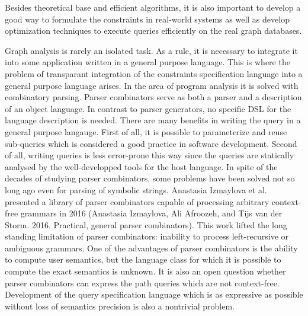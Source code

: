 \documentclass[12pt]{article}  %
\theoremstyle{remark}
\begin{document}
Besides theoretical base and efficient algorithms, it is also important to develop a good way to formulate the constraints in real-world systems as well as develop optimization techniques to execute queries efficiently on the real graph databases.

Graph analysis is rarely an isolated task.
As a rule, it is necessary to integrate it into some application written in a general purpose language.
This is where the problem of transparant integration of the constraints specification language into a general purpose language arises.
In the area of program analysis it is solved with combinatory parsing.
Parser combinators serve as both a parser and a description of an object language.
In contrast to parser generators, no specific DSL for the language description is needed.
There are many benefits in writing the query in a general purpose langauge.
First of all, it is possible to parameterize and reuse sub-queries which is considered a good practice in software development.
Second of all, writing queries is less error-prone this way since the queries are statically analysed by the well-developped tools for the host language.
In spite of the decades of studying parser combinators, some problems have been solved not so long ago even for parsing of symbolic strings.
Anastasia Izmaylova et al. presented a library of parser combinators capable of processing arbitrary context-free grammars in 2016 (Anastasia Izmaylova, Ali Afroozeh, and Tijs van der Storm. 2016. Practical, general parser combinators).
This work lifted the long standing limitation of parser combinators: inability to process left-recursive or ambiguous grammars.
One of the advantages of parser combinators is the ability to compute user semantics, but the language class for which it is possible to compute the exact semantics is unknown.
It is also an open question whether parser combinators can express the path queries which are not context-free.
Development of the query specification language which is as expressive as possible without loss of semantics precision is also a nontrivial problem.
\end{document}
